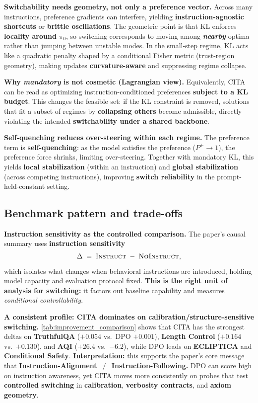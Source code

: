 \noindent\textbf{Switchability needs geometry, not only a preference vector.}
Across many instructions, preference gradients can interfere, yielding \textbf{instruction-agnostic shortcuts} or \textbf{brittle oscillations}. The geometric point is that KL enforces \textbf{locality around $\pi_0$}, so switching corresponds to moving among \textbf{\emph{nearby}} optima rather than jumping between unstable modes. In the small-step regime, KL acts like a quadratic penalty shaped by a conditional Fisher metric (trust-region geometry), making updates \textbf{curvature-aware} and suppressing regime collapse.

\noindent\textbf{Why \emph{mandatory} is not cosmetic (Lagrangian view).}
Equivalently, CITA can be read as optimizing instruction-conditioned preferences \textbf{subject to a KL budget}. This changes the feasible set: if the KL constraint is removed, solutions that fit a subset of regimes by \textbf{collapsing others} become admissible, directly violating the intended \textbf{switchability under a shared backbone}.

\noindent\textbf{Self-quenching reduces over-steering within each regime.}
The preference term is \textbf{self-quenching}: as the model satisfies the preference ($P^+\to 1$), the preference force shrinks, limiting over-steering. Together with mandatory KL, this yields \textbf{local stabilization} (within an instruction) and \textbf{global stabilization} (across competing instructions), improving \textbf{switch reliability} in the prompt-held-constant setting.

\vspace{-0.35em}
\subsection{Benchmark pattern and trade-offs}
\vspace{-0.2em}

\noindent\textbf{Instruction sensitivity as the controlled comparison.}
The paper's causal summary uses \textbf{instruction sensitivity}
\[
\Delta \;=\; \textsc{Instruct} \;-\; \textsc{NoInstruct},
\]
which isolates what changes when behavioral instructions are introduced, holding model capacity and evaluation protocol fixed. \textbf{This is the right unit of analysis for switching:} it factors out baseline capability and measures \emph{conditional controllability}.

\noindent\textbf{A consistent profile: CITA dominates on calibration/structure-sensitive switching.}
\cref{tab:improvement_comparison} shows that CITA has the strongest deltas on \textbf{TruthfulQA} ($+0.054$ vs.\ DPO $+0.001$), \textbf{Length Control} ($+0.164$ vs.\ $+0.130$), and \textbf{AQI} ($+26.4$ vs.\ $-6.2$), while DPO leads on \textbf{ECLIPTICA} and \textbf{Conditional Safety}. \textbf{Interpretation:} this supports the paper's core message that \textbf{Instruction-Alignment $\neq$ Instruction-Following.} DPO can score high on instruction awareness, yet CITA moves more consistently on probes that test \textbf{controlled switching} in \textbf{calibration}, \textbf{verbosity contracts}, and \textbf{axiom geometry}.

